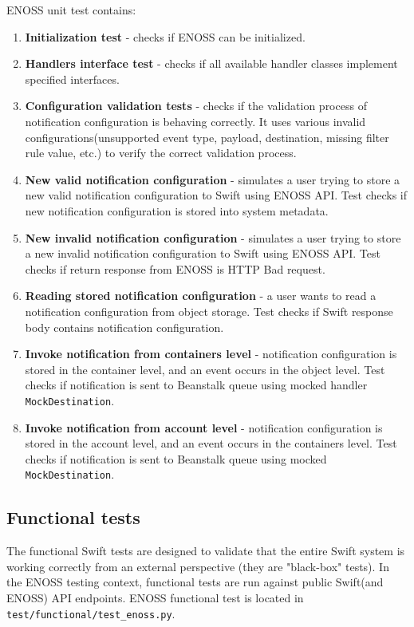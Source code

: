     ENOSS unit test contains:
    \begin{enumerate}
        \item \textbf{Initialization test} - checks if ENOSS can be initialized.
        \item \textbf{Handlers interface test} - checks if all available handler classes implement specified interfaces.
        \item \textbf{Configuration validation tests} - checks if the validation process of notification configuration is behaving correctly. It uses various invalid configurations(unsupported event type, payload, destination, missing filter rule value, etc.) to verify the correct validation process.
        \item \textbf{New valid notification configuration} - simulates a user trying to store a new valid notification configuration to Swift using ENOSS API. Test checks if new notification configuration is stored into system metadata.
        \item \textbf{New invalid notification configuration} - simulates a user trying to store a new invalid notification configuration to Swift using ENOSS API. Test checks if return response from ENOSS is HTTP Bad request.
        \item \textbf{Reading stored notification configuration} - a user wants to read a notification configuration from object storage. Test checks if Swift response body contains notification configuration.
        \item \textbf{Invoke notification from containers level} - notification configuration is stored in the container level, and an event occurs in the object level. Test checks if notification is sent to Beanstalk queue using mocked handler \texttt{MockDestination}.
        \item \textbf{Invoke notification from account level} - notification configuration is stored in the account level, and an event occurs in the containers level. Test checks if notification is sent to Beanstalk queue using mocked \texttt{MockDestination}.
    \end{enumerate}

    \subsection{Functional tests}
    The functional Swift tests are designed to validate that the entire Swift system is working correctly from an external perspective (they are "black-box" tests). In the ENOSS testing context, functional tests are run against public Swift(and ENOSS) API endpoints. ENOSS functional test is located in \texttt{test/functional/test\_enoss.py}.

